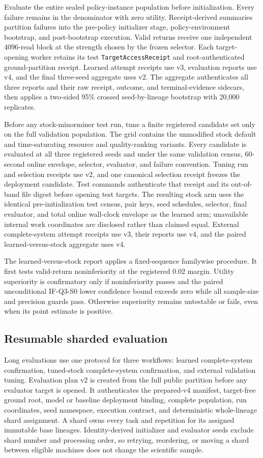 \documentclass[11pt,a4paper]{article}
\theoremstyle{definition}\newtheorem{definition}[proposition]{Definition}
\begin{document}
Evaluate the entire sealed policy-instance population before initialization. Every failure remains in the denominator with zero utility. Receipt-derived summaries partition failures into the pre-policy initializer stage, policy-environment bootstrap, and post-bootstrap execution. Valid returns receive one independent 4096-read block at the strength chosen by the frozen selector. Each target-opening worker retains its test \texttt{TargetAccessReceipt} and root-authenticated ground-partition receipt. Learned attempt receipts use v3, evaluation reports use v4, and the final three-seed aggregate uses v2. The aggregate authenticates all three reports and their raw receipt, outcome, and terminal-evidence sidecars, then applies a two-sided 95\% crossed seed-by-lineage bootstrap with 20,000 replicates.

Before any stock-minorminer test run, tune a finite registered candidate set only on the full validation population. The grid contains the unmodified stock default and time-saturating resource and quality-ranking variants. Every candidate is evaluated at all three registered seeds and under the same validation census, 60-second online envelope, selector, evaluator, and failure convention. Tuning run and selection receipts use v2, and one canonical selection receipt freezes the deployment candidate. Test commands authenticate that receipt and its out-of-band file digest before opening test targets. The resulting stock arm uses the identical pre-initialization test census, pair keys, seed schedules, selector, final evaluator, and total online wall-clock envelope as the learned arm; unavailable internal work coordinates are disclosed rather than claimed equal. External complete-system attempt receipts use v3, their reports use v4, and the paired learned-versus-stock aggregate uses v4.

The learned-versus-stock report applies a fixed-sequence familywise procedure. It first tests valid-return noninferiority at the registered 0.02 margin. Utility superiority is confirmatory only if noninferiority passes and the paired unconditional IF-Q3-S0 lower confidence bound exceeds zero while all sample-size and precision guards pass. Otherwise superiority remains untestable or fails, even when its point estimate is positive.

\subsection{Resumable sharded evaluation}
Long evaluations use one protocol for three workflows: learned complete-system confirmation, tuned-stock complete-system confirmation, and external validation tuning. Evaluation plan v2 is created from the full public partition before any evaluator target is opened. It authenticates the prepared-v4 manifest, target-free ground root, model or baseline deployment binding, complete population, run coordinates, seed namespace, execution contract, and deterministic whole-lineage shard assignment. A shard owns every task and repetition for its assigned immutable base lineages. Identity-derived initializer and evaluator seeds exclude shard number and processing order, so retrying, reordering, or moving a shard between eligible machines does not change the scientific sample.
\end{document}
